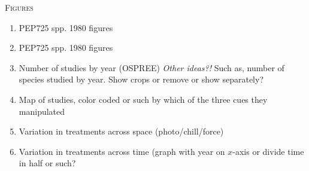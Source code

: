 \documentclass[11pt,letterpaper]{article}
\renewcommand{\section}[1]{%
\bigskip
\begin{center}
\begin{Large}
\normalfont\scshape #1
\medskip
\end{Large}
\end{center}}
\begin{document}
\newpage
\section{Figures}
\begin{enumerate}
\item PEP725 spp. 1980 figures
\item PEP725 spp. 1980 figures
\item Number of studies by year (OSPREE) \emph{Other ideas?!} Such as, number of species studied by year. Show crops or remove or show separately?
\item Map of studies, color coded or such by which of the three cues they manipulated
\item Variation in treatments across space (photo/chill/force)
\item Variation in treatments across time (graph with year on $x$-axis or divide time in half or such? 
\end{enumerate}






%
%


\end{document}
